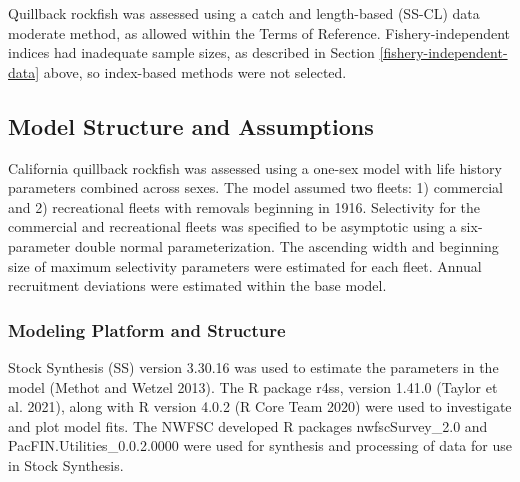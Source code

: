 \documentclass[11pt,
  english,
  letterpaper,
]{article}
\begin{document}
\leavevmode\tagmcend\tagstructend


Quillback rockfish was assessed using a catch and length-based (SS-CL) data moderate method, as allowed within the Terms of Reference. Fishery-independent indices had inadequate sample sizes, as described in Section \ref{fishery-independent-data} above, so index-based methods were not selected.

\leavevmode\tagmcend\tagstructend\par


\hypertarget{model-structure-and-assumptions}{%
\subsection{Model Structure and Assumptions}\label{model-structure-and-assumptions}}

\leavevmode\tagmcend\tagstructend


California quillback rockfish was assessed using a one-sex model with life history parameters combined across sexes. The model assumed two fleets: 1) commercial and 2) recreational fleets with removals beginning in 1916. Selectivity for the commercial and recreational fleets was specified to be asymptotic using a six-parameter double normal parameterization. The ascending width and beginning size of maximum selectivity parameters were estimated for each fleet. Annual recruitment deviations were estimated within the base model.

\leavevmode\tagmcend\tagstructend\par


\hypertarget{modeling-platform-and-structure}{%
\subsubsection{Modeling Platform and Structure}\label{modeling-platform-and-structure}}

\leavevmode\tagmcend\tagstructend


Stock Synthesis (SS) version 3.30.16 was used to estimate the parameters in the model {(Methot and Wetzel 2013)\leavevmode\tagmcend\tagstructend}. The R package r4ss, version 1.41.0 {(Taylor et al. 2021)\leavevmode\tagmcend\tagstructend}, along with R version 4.0.2 {(R Core Team 2020)\leavevmode\tagmcend\tagstructend} were used to investigate and plot model fits. The NWFSC developed R packages nwfscSurvey\_2.0 and PacFIN.Utilities\_0.0.2.0000 were used for synthesis and processing of data for use in Stock Synthesis.
\end{document}
